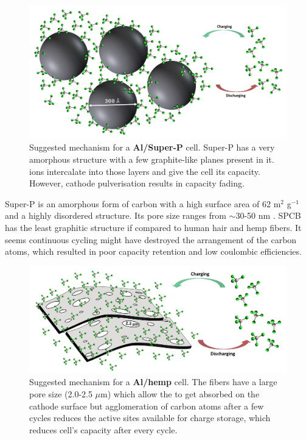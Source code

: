 \documentclass{article}
\begin{document}
 \begin{figure}[tbh!]
  \centering
  \includegraphics[width=\textwidth]{figures/superPmech}
    \caption{Suggested mechanism for a \textbf{Al/Super-P} cell. Super-P has a very amorphous structure with a few graphite-like planes present in it.  ions intercalate into those layers and give the cell its capacity. However, cathode pulverisation results in capacity fading.}
  \label{figures:superPmech}
\end{figure}

Super-P is an amorphous form of carbon with a high surface area of 62 m$^2$ g$^{-1}$ and a highly disordered structure. Its pore size ranges from $\sim$30-50 nm \cite{younesi_analysis_2015}. SPCB has the least graphitic structure if compared to human hair and hemp fibers. It seems continuous cycling might have destroyed the arrangement of the carbon atoms, which resulted in poor capacity retention and low coulombic efficiencies.

 \begin{figure}[tbh!]
  \centering
  \includegraphics[width=\textwidth]{figures/hempmech}
    \caption{Suggested mechanism for a \textbf{Al/hemp} cell. The fibers have a large pore size (2.0-2.5 $\mu$m) which allow the  to get absorbed on the cathode surface but agglomeration of carbon atoms after a few cycles reduces the active sites available for charge storage, which reduces cell's capacity after every cycle.}
  \label{figures:hempmech}
\end{figure}
\end{document}
